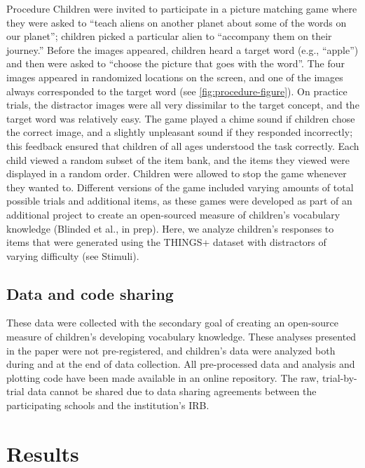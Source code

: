 \documentclass[
  man,mask]{apa6}
\begin{document}
Procedure
Children were invited to participate in a picture matching game where they were asked to ``teach aliens on another planet about some of the words on our planet''; children picked a particular alien to ``accompany them on their journey.'' Before the images appeared, children heard a target word (e.g., ``apple'') and then were asked to ``choose the picture that goes with the word''. The four images appeared in randomized locations on the screen, and one of the images always corresponded to the target word (see \ref{fig:procedure-figure}). On practice trials, the distractor images were all very dissimilar to the target concept, and the target word was relatively easy. The game played a chime sound if children chose the correct image, and a slightly unpleasant sound if they responded incorrectly; this feedback ensured that children of all ages understood the task correctly. Each child viewed a random subset of the item bank, and the items they viewed were displayed in a random order. Children were allowed to stop the game whenever they wanted to. Different versions of the game included varying amounts of total possible trials and additional items, as these games were developed as part of an additional project to create an open-sourced measure of children's vocabulary knowledge (Blinded et al., in prep). Here, we analyze children's responses to items that were generated using the THINGS+ dataset with distractors of varying difficulty (see Stimuli).

\subsection{Data and code sharing}\label{data-and-code-sharing}

These data were collected with the secondary goal of creating an open-source measure of children's developing vocabulary knowledge. These analyses presented in the paper were not pre-registered, and children's data were analyzed both during and at the end of data collection. All pre-processed data and analysis and plotting code have been made available in an online repository. The raw, trial-by-trial data cannot be shared due to data sharing agreements between the participating schools and the institution's IRB.

\section{Results}\label{results}
\end{document}
